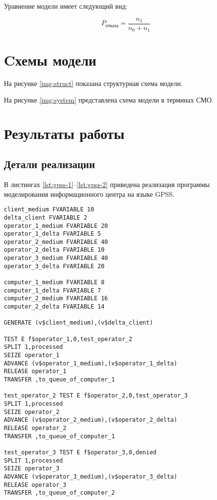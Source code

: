 Уравнение модели имеет следующий вид:

\begin{equation}
    P_{\text{отказа}} = \frac{n_{1}}{n_{0} + n_{1}}
\end{equation}

\section*{Cхемы модели}

На рисунке \ref{img:struct} показана структурная схема модели.


На рисунке \ref{img:system} представлена схема модели в терминах СМО.


\section*{Результаты работы}

\subsection*{Детали реализации}

В листингах \ref{lst:gpss-1}--\ref{lst:gpss-2} приведена реализация программы моделирования информационного центра на языке GPSS.
\clearpage

\begin{center}
\captionsetup{justification=raggedright,singlelinecheck=off}
\begin{lstlisting}[label=lst:gpss-1,caption=Реализация программмы на языке GPSS, часть 1]
client_medium FVARIABLE 10
delta_client FVARIABLE 2
operator_1_medium FVARIABLE 20
operator_1_delta FVARIABLE 5
operator_2_medium FVARIABLE 40
operator_2_delta FVARIABLE 10
operator_3_medium FVARIABLE 40
operator_3_delta FVARIABLE 20

computer_1_medium FVARIABLE 8
computer_1_delta FVARIABLE 7
computer_2_medium FVARIABLE 16
computer_2_delta FVARIABLE 14

GENERATE (v$client_medium),(v$delta_client)

TEST E f$operator_1,0,test_operator_2
SPLIT 1,processed
SEIZE operator_1
ADVANCE (v$operator_1_medium),(v$operator_1_delta)
RELEASE operator_1
TRANSFER ,to_queue_of_computer_1

test_operator_2 TEST E f$operator_2,0,test_operator_3
SPLIT 1,processed
SEIZE operator_2
ADVANCE (v$operator_2_medium),(v$operator_2_delta)
RELEASE operator_2
TRANSFER ,to_queue_of_computer_1

test_operator_3 TEST E f$operator_3,0,denied
SPLIT 1,processed
SEIZE operator_3
ADVANCE (v$operator_3_medium),(v$operator_3_delta)
RELEASE operator_3
TRANSFER ,to_queue_of_computer_2
\end{lstlisting}
\end{center}

